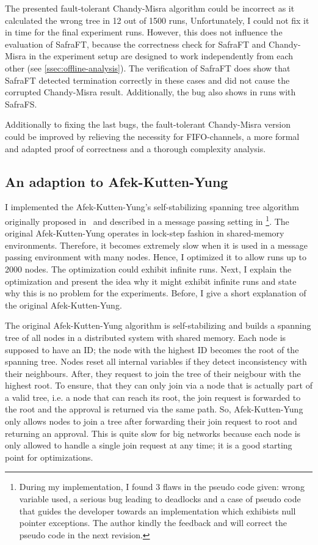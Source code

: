 The presented fault-tolerant Chandy-Misra algorithm could be incorrect as it calculated the wrong tree in 12 out of 1500 runs,
Unfortunately, I could not fix it in time for the final experiment runs.
However, this does not influence the evaluation of SafraFT, because the correctness check for SafraFT and Chandy-Misra in the experiment setup are designed to work independently from each other (see \cref{ssec:offline-analysis}).
The verification of SafraFT does show that SafraFT detected termination correctly in these cases and did not cause the corrupted Chandy-Misra result.
Additionally, the bug also shows in runs with SafraFS.

Additionally to fixing the last bugs, the fault-tolerant Chandy-Misra version could be improved by relieving the necessity for FIFO-channels, a more formal and adapted proof of correctness and a thorough complexity analysis.

\subsection{An adaption to Afek-Kutten-Yung}
I implemented the Afek-Kutten-Yung's self-stabilizing spanning tree algorithm originally proposed in~\cite{afek} and  described in a message passing setting in \cite[page 183ff]{fokkink:2018}\footnote{During my implementation, I found 3 flaws in the pseudo code given: wrong variable used, a serious bug leading to deadlocks and a case of pseudo code that guides the developer towards an implementation which exhibists null pointer exceptions. The author kindly the feedback and will correct the pseudo code in the next revision.}.
The original Afek-Kutten-Yung operates in lock-step fashion in shared-memory environments.
Therefore, it becomes extremely slow when it is used in a message passing environment with many nodes.
Hence, I optimized it to allow runs up to 2000 nodes.
The optimization could exhibit infinite runs.
Next, I explain the optimization and present the idea why it might exhibit infinite runs and state why this is no problem for the experiments. Before, I give a short explanation of the original Afek-Kutten-Yung.

The original Afek-Kutten-Yung algorithm is self-stabilizing and builds a spanning tree of all nodes in a distributed system with shared memory. 
Each node is supposed to have an ID; the node with the highest ID becomes the root of the spanning tree.
Nodes reset all internal variables if they detect inconsistency with their neighbours.
After, they request to join the tree of their neigbour with the highest root.
To ensure, that they can only join via a node that is actually part of a valid tree, i.e. a node that can reach its root, the join request is forwarded to the root and the approval is returned via the same path.
So, Afek-Kutten-Yung only allows nodes to join a tree after forwarding their join request to root and returning an approval.
This is quite slow for big networks because each node is only allowed to handle a single join request at any time; 
it is a good starting point for optimizations.

